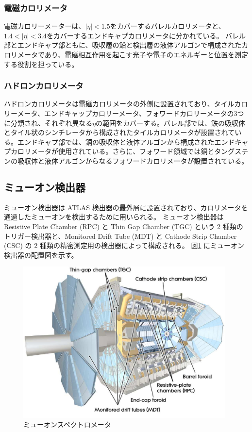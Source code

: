 \subsubsection{電磁カロリメータ}
電磁カロリーメーターは、$|\eta|<1.5$をカバーするバレルカロリメータと、$1.4<|\eta|<3.4$をカバーするエンドキャプカロリメータに分かれている。
バレル部とエンドキャプ部ともに、吸収層の鉛と検出層の液体アルゴンで構成されたカロリメータであり、電磁相互作用を起こす光子や電子のエネルギーと位置を測定する役割を担っている。

\subsubsection{ハドロンカロリメータ}
ハドロンカロリメータは電磁カロリメータの外側に設置されており、タイルカロリーメータ、エンドキャップカロリーメータ、フォワードカロリーメータの3つに分類され、それぞれ異なる$\eta$の範囲をカバーする。バレル部では、鉄の吸収体とタイル状のシンチレータから構成されたタイルカロリメータが設置されている。エンドキャプ部では、銅の吸収体と液体アルゴンから構成されたエンドキャプカロリメータが使用されている。さらに、フォワード領域では銅とタングステンの吸収体と液体アルゴンからなるフォワードカロリメータが設置されている。

\subsection{ミューオン検出器}\label{section2-2-4}
ミューオン検出器は ATLAS 検出器の最外層に設置されており、カロリメータを通過したミューオンを検出するために用いられる。
ミューオン検出器は Resistive Plate Chamber (RPC) と Thin Gap Chamber (TGC) という 2 種類のトリガー検出器と、Monitored Drift Tube (MDT) と Cathode Strip Chamber (CSC) の 2 種類の精密測定用の検出器によって構成される。
図\ref{fig:ミューオン} にミューオン検出器の配置図を示す。

\begin{figure}[tb]
  \centering
  \includegraphics[clip, width=11cm]{fig/2/MuonSystem_d3.pdf}
  \caption{ミューオンスペクトロメータ}
  \label{fig:ミューオン}
\end{figure}

